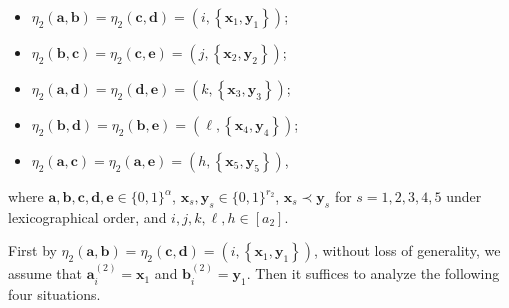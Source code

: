\documentclass[11pt]{article}
\theoremstyle{definition}
\newcommand{\aaa}{\boldsymbol{a}}
\newcommand{\bb}{\boldsymbol{b}}
\newcommand{\cc}{\boldsymbol{c}}
\newcommand{\dd}{\boldsymbol{d}}
\newcommand{\ee}{\boldsymbol{e}}
\begin{document}
\begin{itemize}
    \item $\eta_{2}(\aaa,\bb)=\eta_{2}(\cc,\dd)=(i,\left\{\boldsymbol{x}_{1},\boldsymbol{y}_{1}\right\})$;
    \item $\eta_{2}(\bb,\cc)=\eta_{2}(\cc,\ee)=(j,\left\{\boldsymbol{x}_{2},\boldsymbol{y}_{2}\right\})$;
    \item $\eta_{2}(\aaa,\dd)=\eta_{2}(\dd,\ee)=(k,\left\{\boldsymbol{x}_{3},\boldsymbol{y}_{3}\right\})$;
    \item $\eta_{2}(\bb,\dd)=\eta_{2}(\bb,\ee)=(\ell,\left\{\boldsymbol{x}_{4},\boldsymbol{y}_{4}\right\})$;
    \item $\eta_{2}(\aaa,\cc)=\eta_{2}(\aaa,\ee)=(h,\left\{\boldsymbol{x}_{5},\boldsymbol{y}_{5}\right\})$,
\end{itemize}
where $\boldsymbol{a},\bb,\cc,\dd,\ee\in\{0,1\}^{\alpha}$, $\boldsymbol{x}_{s},\boldsymbol{y}_{s}\in\{0,1\}^{r_{2}}$, $\boldsymbol{x}_{s}\prec\boldsymbol{y}_{s}$ for $s=1,2,3,4,5$ under lexicographical order, and $i,j,k,\ell,h\in [a_{2}]$.

First by $\eta_{2}(\aaa,\bb)=\eta_{2}(\cc,\dd)=(i,\left\{\boldsymbol{x}_{1},\boldsymbol{y}_{1}\right\})$, without loss of generality, we assume that $\aaa_{i}^{(2)}=\boldsymbol{x}_{1}$ and $\bb_{i}^{(2)}=\boldsymbol{y}_{1}$. Then it suffices to analyze the following four situations. 
\end{document}
